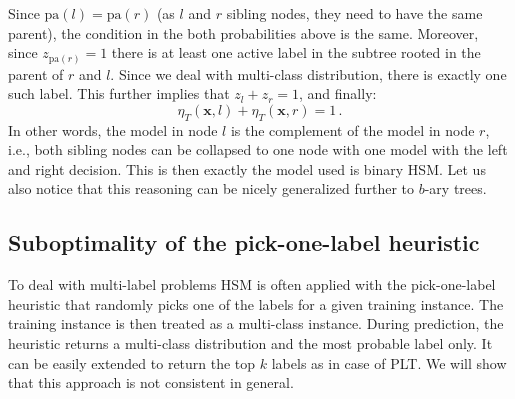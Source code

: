 \documentclass{article}
\renewcommand{\vec}[1]{\boldsymbol{#1}}
\newcommand{\bx}{\vec{x}}
\newcommand{\heta}{\hat{\eta}}
\newcommand{\pa}[1]{\mathrm{pa}(#1)}
\newcommand{\prob}{\mathbf{P}}
\newcommand{\sectionBefore}{-0pt}
\newcommand{\sectionAfter}{-0pt}
\begin{document}
Since $\pa{l} = \pa{r}$ (as $l$ and $r$ sibling nodes, they need to have the same parent), the condition in the both probabilities above is the same. Moreover, since $z_{\pa{r}} =1$ there is at least one active label in the subtree rooted in the parent of $r$ and $l$. Since we deal with multi-class distribution, there is exactly one such label. This further implies that $z_l + z_r = 1$, and finally: 
\begin{equation}
\eta_T(\bx, l)+ \eta_T(\bx, r) = 1 \,.
\label{eqn:sibling_summation}
\end{equation}
In other words, the model in node $l$ is the complement of the model in node $r$, i.e., both sibling nodes can be collapsed to one node with one model with the left and right decision. This is then exactly the model used is binary HSM. Let us also notice that this reasoning can be nicely generalized further to $b$-ary trees.


\vspace{\sectionBefore}
\subsection{Suboptimality of the pick-one-label heuristic}
\label{sec:pick-one-label}
\vspace{\sectionAfter}

To deal with multi-label problems HSM is often applied with the pick-one-label heuristic that randomly picks one of the labels for a given training instance. The training instance is then treated as a multi-class instance. During prediction, the heuristic returns a multi-class distribution and the most probable label only. It can be easily extended to return the top $k$ labels as in case of PLT. We will show that this approach is not consistent in general. 

\end{document}
